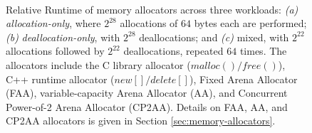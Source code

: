 \begin{figure}[hbtp]
  \centering
   \\[-2ex]
  \caption{Relative Runtime of memory allocators across three workloads: \textit{(a)} \textit{allocation-only}, where $2^{28}$ allocations of $64$ bytes each are performed; \textit{(b)} \textit{deallocation-only}, with $2^{28}$ deallocations; and \textit{(c)} mixed, with $2^{22}$ allocations followed by $2^{22}$ deallocations, repeated $64$ times. The allocators include the C library allocator ($malloc()/free()$), C++ runtime allocator ($new[]/delete[]$), Fixed Arena Allocator (FAA), variable-capacity Arena Allocator (AA), and Concurrent Power-of-2 Arena Allocator (CP2AA). Details on FAA, AA, and CP2AA allocators is given in Section \ref{sec:memory-allocators}.}
  \label{fig:allocator-runtime}
\end{figure}
